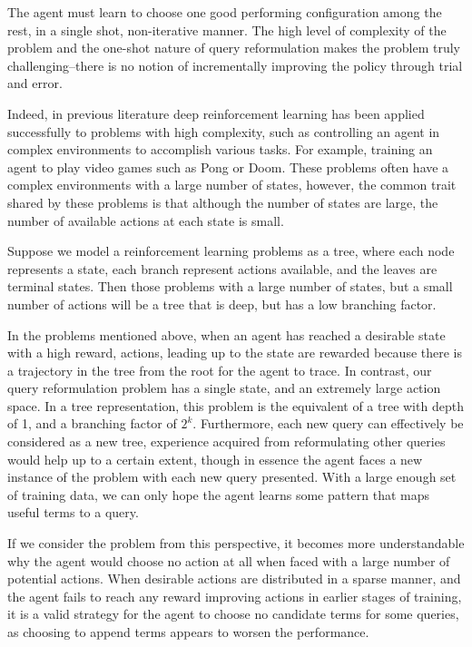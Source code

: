 The agent must learn to choose one good performing configuration among the rest, in a single shot, non-iterative manner. The high level of complexity of the problem and the one-shot nature of query reformulation makes the problem truly challenging--there is no notion of incrementally improving the policy through trial and error.

Indeed, in previous literature deep reinforcement learning has been applied successfully to problems with high complexity, such as controlling an agent in complex environments to accomplish various tasks. For example, training an agent to play video games such as Pong or Doom. These problems often have a complex environments with a large number of states, however, the common trait shared by these problems is that although the number of states are large, the number of available actions at each state is small. 

Suppose we model a reinforcement learning problems as a tree, where each node represents a state, each branch represent actions available, and the leaves are terminal states. Then those problems with a large number of states, but a small number of actions will be a tree that is deep, but has a low branching factor.  

In the problems mentioned above, when an agent has reached a desirable state with a high reward, actions, leading up to the state are rewarded because there is a trajectory in the tree from the root for the agent to trace. In contrast, our query reformulation problem has a single state, and an extremely large action space. In a tree representation, this problem is the equivalent of a tree with depth of 1, and a branching factor of $2^{k}$.  Furthermore, each new query can effectively be considered as a new tree, experience acquired from reformulating other queries would help up to a certain extent, though in essence the agent faces a new instance of the problem with each new query presented. With a large enough set of training data, we can only hope the agent learns some pattern that maps useful terms to a query. 

If we consider the problem from this perspective, it becomes more understandable why the agent would choose no action at all when faced with a large number of potential actions. When desirable actions are distributed in a sparse manner, and the agent fails to reach any reward improving actions in earlier stages of training, it is a valid strategy for the agent to choose no candidate terms for some queries, as choosing to append terms appears to worsen the performance.

